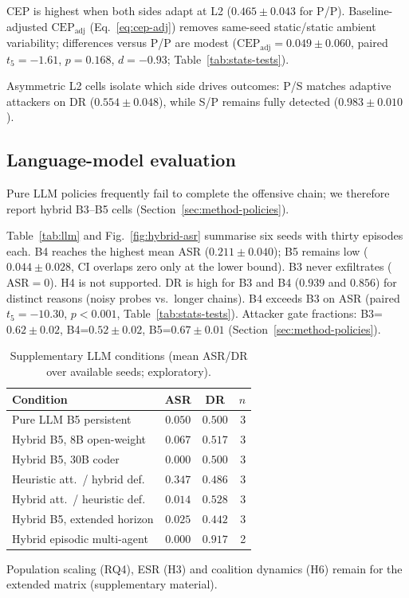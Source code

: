 






CEP is highest when both sides adapt at L2 ($0.465{\pm}0.043$ for P/P). Baseline-adjusted
$\mathrm{CEP}_{\mathrm{adj}}$ (Eq.~\eqref{eq:cep-adj}) removes same-seed
static/static ambient variability; differences versus P/P are modest
($\mathrm{CEP}_{\mathrm{adj}}=0.049{\pm}0.060$, paired $t_{5}=-1.61$, $p=0.168$,
$d=-0.93$; Table~\ref{tab:stats-tests}).

Asymmetric L2 cells isolate which side drives outcomes: P/S matches adaptive
attackers on DR ($0.554{\pm}0.048$), while S/P remains fully detected
($0.983{\pm}0.010$).



\subsection{Language-model evaluation}
\label{sec:results-llm}
Pure LLM policies frequently fail to complete the offensive chain; we
therefore report hybrid B3--B5 cells (Section~\ref{sec:method-policies}).

Table~\ref{tab:llm} and Fig.~\ref{fig:hybrid-asr} summarise six seeds with
thirty episodes each. B4 reaches the highest mean ASR ($0.211{\pm}0.040$);
B5 remains low ($0.044{\pm}0.028$, CI overlaps zero only at the lower bound).
B3 never exfiltrates ($\mathrm{ASR}=0$). H4 is not supported. DR is high for
B3 and B4 ($0.939$ and $0.856$) for distinct reasons (noisy probes vs.\ longer
chains). B4 exceeds B3 on ASR (paired $t_{5}=-10.30$, $p<0.001$, Table~\ref{tab:stats-tests}).
Attacker gate fractions: B3=$0.62{\pm}0.02$, B4=$0.52{\pm}0.02$, B5=$0.67{\pm}0.01$
(Section~\ref{sec:method-policies}).




\begin{table}[!t]
\caption{Supplementary LLM conditions (mean ASR/DR over available seeds; exploratory).}
\label{tab:llm_ablation}
\centering
\setlength{\tabcolsep}{4pt}
\begin{tabular}{@{}lccr@{}}
\toprule
\textbf{Condition} & \textbf{ASR} & \textbf{DR} & \textbf{$n$} \\
\midrule
Pure LLM B5 persistent           & $0.050$ & $0.500$ & 3 \\
Hybrid B5, 8B open-weight      & $0.067$ & $0.517$ & 3 \\
Hybrid B5, 30B coder           & $0.000$ & $0.500$ & 3 \\
Heuristic att.\ / hybrid def.  & $0.347$ & $0.486$ & 3 \\
Hybrid att.\ / heuristic def.  & $0.014$ & $0.528$ & 3 \\
Hybrid B5, extended horizon    & $0.025$ & $0.442$ & 3 \\
Hybrid episodic multi-agent    & $0.000$ & $0.917$ & 2 \\
\bottomrule
\end{tabular}
\end{table}

Population scaling (RQ4), ESR (H3) and coalition dynamics (H6) remain for
the extended matrix (supplementary material).
